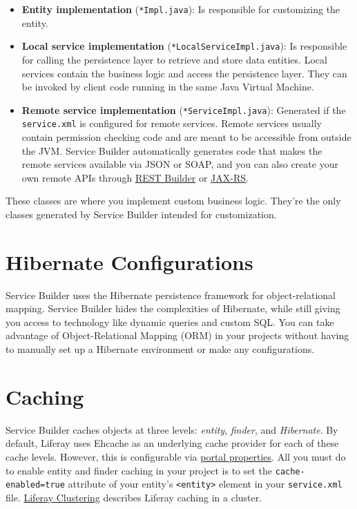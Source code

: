 \begin{itemize}
\item
  \textbf{Entity implementation} (\texttt{*Impl.java}): Is responsible
  for customizing the entity.
\item
  \textbf{Local service implementation}
  (\texttt{*LocalServiceImpl.java}): Is responsible for calling the
  persistence layer to retrieve and store data entities. Local services
  contain the business logic and access the persistence layer. They can
  be invoked by client code running in the same Java Virtual Machine.
\item
  \textbf{Remote service implementation} (\texttt{*ServiceImpl.java}):
  Generated if the \texttt{service.xml} is configured for remote
  services. Remote services usually contain permission checking code and
  are meant to be accessible from outside the JVM. Service Builder
  automatically generates code that makes the remote services available
  via JSON or SOAP, and you can also create your own remote APIs through
  \href{/docs/7-2/appdev/-/knowledge_base/a/rest-builder}{REST Builder}
  or \href{/docs/7-2/frameworks/-/knowledge_base/f/jax-rs}{JAX-RS}.
\end{itemize}

These classes are where you implement custom business logic. They're the
only classes generated by Service Builder intended for customization.

\section{Hibernate Configurations}\label{hibernate-configurations}

Service Builder uses the Hibernate persistence framework for
object-relational mapping. Service Builder hides the complexities of
Hibernate, while still giving you access to technology like dynamic
queries and custom SQL. You can take advantage of Object-Relational
Mapping (ORM) in your projects without having to manually set up a
Hibernate environment or make any configurations.

\section{Caching}\label{caching}

Service Builder caches objects at three levels: \emph{entity},
\emph{finder}, and \emph{Hibernate}. By default, Liferay uses Ehcache as
an underlying cache provider for each of these cache levels. However,
this is configurable via
\href{/docs/7-2/deploy/-/knowledge_base/d/portal-properties}{portal
properties}. All you must do to enable entity and finder caching in your
project is to set the \texttt{cache-enabled=true} attribute of your
entity's \texttt{\textless{}entity\textgreater{}} element in your
\texttt{service.xml} file.
\href{/docs/7-2/deploy/-/knowledge_base/d/enabling-cluster-link}{Liferay
Clustering} describes Liferay caching in a cluster.

